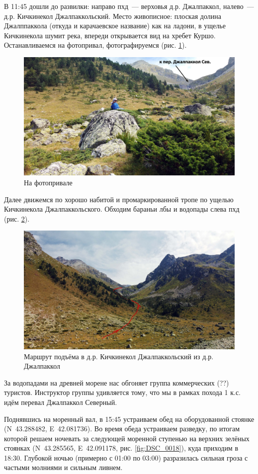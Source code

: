 В 11:45 дошли до развилки: направо пхд~--- верховья д.р. Джалпаккол, налево~--- д.р. Кичкинекол Джалпаккольский. Место живописное: плоская долина Джалппаккола (откуда и карачаевское название) как на ладони, в ущелье Кичкинекола шумит река, впереди открывается вид на хребет Куршо. Останавливаемся на фотопривал, фотографируемся (рис. \ref{fig:DJI_0830}).

\begin{figure}[h!]
	\centering
	\includegraphics[width=0.7\linewidth]{../pics/DJI_0830}
	\caption{На фотопривале}
	\label{fig:DJI_0830}
\end{figure}

Далее движемся по хорошо набитой и промаркированной тропе по ущелью Кичкинекола Джалпаккольского. Обходим бараньи лбы и водопады слева пхд (рис. \ref{fig:DJI_0835}).


\begin{figure}[h!]
	\centering
	\includegraphics[width=0.7\linewidth]{../pics/DJI_0835}
	\caption{Маршрут подъёма в д.р. Кичкинекол Джалпаккольский из д.р. Джалпаккол}
	\label{fig:DJI_0835}
\end{figure}

За водопадами на древней морене нас обгоняет группа коммерческих (??) туристов. Инструктор группы удивляется тому, что мы в рамках похода 1 к.с. идём перевал Джалпаккол Северный.

Поднявшись на моренный вал, в 15:45 устраиваем обед на оборудованной стоянке (N~43.288482\degree, E~42.081736\degree). Во время обеда устраиваем разведку, по итогам которой решаем ночевать за следующей моренной ступенью на верхних зелёных стоянках (N~43.285565\degree, E~42.091178\degree, рис. \ref{fig:DSC_0018}), куда приходим в 18:30. Глубокой ночью (примерно с 01:00 по 03:00) разразилась сильная гроза с частыми молниями и сильным ливнем.

